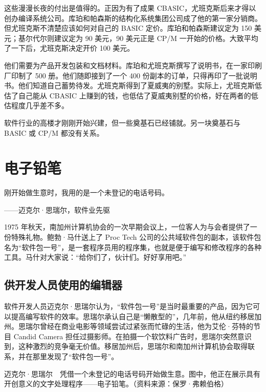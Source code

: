 \documentclass[12pt,UTF8]{ctexbook}
\begin{document}
这些漫漫长夜的付出是值得的。正因为有了成果 CBASIC，尤班克斯后来才得以创办编译系统公司。库珀和帕森斯的结构化系统集团公司成了他的第一家分销商。但尤班克斯不清楚应该如何对自己的 BASIC 定价。库珀和帕森斯建议定为 150 美元；基尔代尔则建议定为 90 美元，90 美元正是 CP/M 一开始的价格。大致平均了一下后，尤班克斯决定开价 100 美元。

他们需要为产品开发包装和文档材料。库珀和尤班克斯撰写了说明书，在一家印刷厂印制了 500 册。他们随即接到了一个 400 份副本的订单，只得再印了一批说明书。他们知道自己蓄势待发。尤班克斯得到了夏威夷的别墅。实际上，尤班克斯低估了自己能从 CBASIC 上赚到的钱，也低估了夏威夷别墅的价格，好在两者的低估程度几乎差不多。

软件行业的高楼才刚刚开始兴建，但一些奠基石已经铺就。另一块奠基石与 BASIC 或 CP/M 都没有关系。





\section{电子铅笔}


刚开始做生意时，我用的是一个未登记的电话号码。

——迈克尔·思瑞尔，软件业先驱



1975 年秋天，南加州计算机协会的一次早期会议上，一位客人为与会者提供了一份特殊礼物。鲍勃·马什送上了 Proc Tech 公司的公共域软件包的副本，该软件包名为“软件包一号”，是一套程序员用的程序集，也就是便于编写和修改程序的各种工具。马什对大家说：“给你们了，伙计们。好好享用吧。”





\subsection{供开发人员使用的编辑器}


软件开发人员迈克尔·思瑞尔认为，“软件包一号”是当时最重要的产品，因为它可以提高编写软件的效率。思瑞尔承认自己是“懒散型的”，几年前，他从纽约移居加州。思瑞尔曾经在商业电影等领域尝试过紧张而忙碌的生活，他为艾伦·芬特的节目 Candid Camera 担任过摄影师。在拍摄一个软饮料广告时，思瑞尔突然意识到，这种激烈的竞争毫无价值。移居加州后，思瑞尔和南加州计算机协会取得联系，并在那里发现了“软件包一号”。



迈克尔·思瑞尔　凭借一个未登记的电话号码开始做生意。图中，他正在展示具有开创意义的文字处理程序——电子铅笔。（资料来源：保罗·弗赖伯格）
\end{document}
